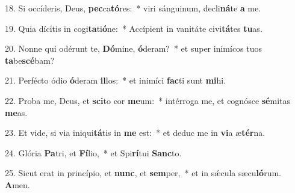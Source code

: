 18. Si occíderis, Deus, \textbf{pec}ca\textbf{tó}res:~*  viri sánguinum, decli\textbf{ná}te \textbf{a} me.\

19. Quia dícitis in cogi\textbf{ta}ti\textbf{ó}ne:~*  Accípient in vanitáte civi\textbf{tá}tes \textbf{tu}as.\

20. Nonne qui odérunt te, \textbf{Dó}mine, \textbf{ó}deram?~*  et super inimícos tuos \textbf{ta}be\textbf{scé}bam?\

21. Perfécto ódio \textbf{ó}deram \textbf{il}los:~*  et inimíci \textbf{fac}ti sunt \textbf{mi}hi.\

22. Proba me, Deus, et \textbf{sci}to cor \textbf{me}um:~*  intérroga me, et cognósce \textbf{sé}mitas \textbf{me}as.\

23. Et vide, si via iniqui\textbf{tá}tis in \textbf{me} est:~*  et deduc me in \textbf{vi}a æ\textbf{tér}na.\

24. Glória \textbf{Pa}tri, et \textbf{Fí}lio,~*  et Spi\textbf{rí}tui \textbf{Sanc}to.\

25. Sicut erat in princípio, et \textbf{nunc}, et \textbf{sem}per,~*  et in sǽcula sæcu\textbf{ló}rum. \textbf{A}men.\

